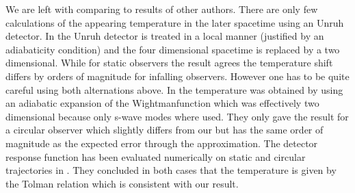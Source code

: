 We are left with comparing to results of other authors. There are only few calculations of the appearing temperature in the later spacetime using an Unruh detector. In \cite{deeg} the Unruh detector is treated in a local manner (justified by an adiabaticity condition) and the four dimensional spacetime is replaced by a two dimensional. While for static observers the result agrees the temperature shift differs by orders of magnitude for infalling observers. However one has to be quite careful using both alternations above. In \cite{smerlak} the temperature was obtained by using an adiabatic expansion of the Wightmanfunction which was effectively two dimensional because only s-wave modes where used. They only gave the result for a circular observer which slightly differs from our but has the same order of magnitude as the expected error through the approximation. The detector response function has been evaluated numerically on static and circular trajectories in \cite{Hodgkinson}. They concluded in both cases that the temperature is given by the Tolman relation which is consistent with our result.  